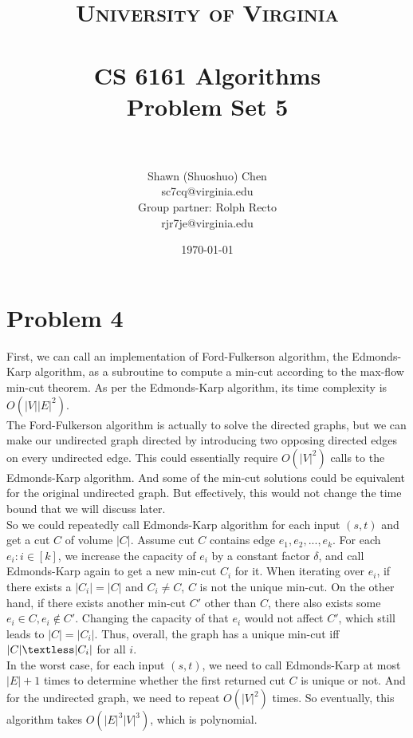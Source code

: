 \documentclass[titlepage, paper=a4, fontsize=11pt]{scrartcl} %
\title{	
\normalfont \normalsize 
\textsc{University of Virginia} \\ [25pt] %
\horrule{0.5pt} \\[0.4cm] %
\huge CS 6161 Algorithms \\
\huge Problem Set 5 \\ %
\horrule{2pt} \\[0.5cm] %
}
\author{Shawn (Shuoshuo) Chen\\sc7cq@virginia.edu\\Group partner: Rolph Recto\\ rjr7je@virginia.edu} %
\date{\normalsize\today} %
\numberwithin{equation}{section} %
\numberwithin{figure}{section} %
\numberwithin{table}{section} %
\begin{document}
\maketitle %


\section*{Problem 4}
First, we can call an implementation of Ford-Fulkerson algorithm, the Edmonds-Karp algorithm, as a subroutine to compute a min-cut according to the max-flow min-cut theorem. As per the Edmonds-Karp algorithm, its time complexity is $O(|V||E|^2)$. \\

The Ford-Fulkerson algorithm is actually to solve the directed graphs, but we can make our undirected graph directed by introducing two opposing directed edges on every undirected edge. This could essentially require $O(|V|^2)$ calls to the Edmonds-Karp algorithm. And some of the min-cut solutions could be equivalent for the original undirected graph. But effectively, this would not change the time bound that we will discuss later. \\

So we could repeatedly call Edmonds-Karp algorithm for each input $(s, t)$ and get a cut $C$ of volume $|C|$. Assume cut $C$ contains edge $e_1, e_2, ... , e_k$. For each $e_i: i \in [k]$, we increase the capacity of $e_i$ by a constant factor $\delta$, and call Edmonds-Karp again to get a new min-cut $C_i$ for it. When iterating over $e_i$, if there exists a $|C_i|=|C|$ and $C_i \neq C$, $C$ is not the unique min-cut. On the other hand, if there exists another min-cut $C'$ other than $C$, there also exists some $e_i \in C, e_i \notin C'$. Changing the capacity of that $e_i$ would not affect $C'$, which still leads to $|C|=|C_i|$. Thus, overall, the graph has a unique min-cut iff $|C| \textless |C_i|$ for all $i$. \\

In the worst case, for each input $(s, t)$, we need to call Edmonds-Karp at most $|E|+1$ times to determine whether the first returned cut $C$ is unique or not. And for the undirected graph, we need to repeat $O(|V|^2)$ times. So eventually, this algorithm takes $O(|E|^3|V|^3)$, which is polynomial.
\end{document}

